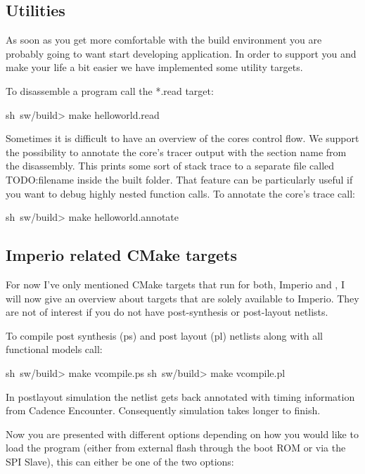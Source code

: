 \subsection{Utilities}

As soon as you get more comfortable with the build environment you are probably going to want start developing application. In order to support you and make your life a bit easier we have implemented some utility targets.

To disassemble a program call the *.read target:

\begin{shellenv}
sh~sw/build> make helloworld.read
\end{shellenv}

Sometimes it is difficult to have an overview of the cores control flow. We support the possibility to annotate the core's tracer output with the section name from the disassembly. This prints some sort of stack trace to a separate file called TODO:filename inside the built folder. That feature can be particularly useful if you want to debug highly nested function calls. To annotate the core's trace call:

\begin{shellenv}
sh~sw/build> make helloworld.annotate
\end{shellenv}

\subsection{Imperio related CMake targets}

For now I've only mentioned CMake targets that run for both, Imperio and \pulpino, I will now give an overview about targets that are solely available to Imperio. They are not of interest if you do not have post-synthesis or post-layout netlists.

To compile post synthesis (ps) and post layout (pl) netlists along with all functional models call:

\begin{shellenv}
sh~sw/build> make vcompile.ps
sh~sw/build> make vcompile.pl
\end{shellenv}

In postlayout simulation the netlist gets back annotated with timing information from Cadence Encounter. Consequently simulation takes longer to finish.

Now you are presented with different options depending on how you would like to load the program (either from external flash through the boot ROM or via the SPI Slave), this can either be one of the two options:

